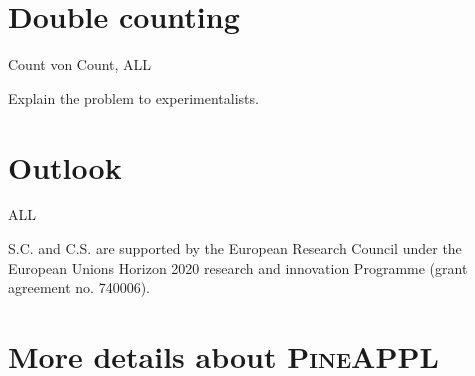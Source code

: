 \documentclass[a4paper,11pt]{article}
\begin{document}
\section{Double counting}

Count von Count, ALL

Explain the problem to experimentalists.\\

\section{Outlook}

ALL

\cite{Carli:2010rw}
\cite{Bertone:2014zva}

\appendix

\acknowledgments

S.C. and C.S. are supported by the European Research Council under the European Unions Horizon 2020 research and innovation Programme (grant agreement no. 740006).

\section{More details about \texorpdfstring{\textsc{PineAPPL}}{PineAPPL}}
\label{app:pineappl-interface}





\end{document}

